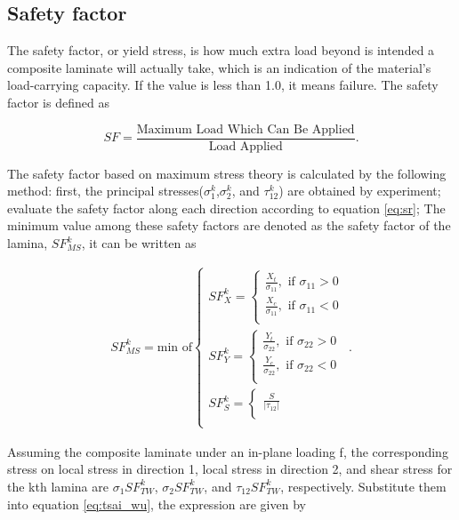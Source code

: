 \subsection{Safety factor}
The safety factor, or yield stress, is how much extra load beyond is intended a
composite laminate will actually take, which is an indication of the material's
load-carrying capacity. If the value is less than 1.0, it means failure. The
safety factor is defined as 

\begin{equation} \label{eq:sr}SF=\frac{\text {Maximum Load Which Can Be
	Applied}}{\text {Load Applied}} {\textstyle .}
\end{equation}

The safety factor based on maximum stress theory is calculated by the following
method: first, the principal stresses($\sigma_1^k$,$\sigma_2^k$, and
$\tau_{12}^k$) are obtained by experiment; evaluate the safety factor along each
direction according to equation \ref{eq:sr}; The minimum value among these
safety factors are denoted as the safety factor of the lamina, $SF_{MS}^k$, it
can be written as 

\begin{align}
	SF_{MS}^k = \text{min of}
	\begin{cases}
		SF_X^k = 
		\begin{cases}
			\frac{X_t}{\sigma_{11}}, \text{ if } \sigma_{11}>0 \\
			\frac{X_c}{\sigma_{11}}, \text{ if } \sigma_{11}<0 \\
		\end{cases} \\
		SF_Y^k = 
		\begin{cases}
			\frac{Y_t}{\sigma_{22}}, \text{ if } \sigma_{22}>0 \\
			\frac{Y_c}{\sigma_{22}}, \text{ if } \sigma_{22}<0 \\
		\end{cases} \\
		SF_S^k =
		\begin{cases}
			\frac{S}{|\tau_{12}|} \\
		\end{cases} \\
	\end{cases} \textstyle{.}
\end{align}


Assuming the composite laminate under an in-plane loading f, the corresponding
stress on local stress in direction 1, local stress in direction 2, and shear
stress for the kth lamina are $\sigma_1 SF_{TW}^k$, $\sigma_2SF_{TW}^k$, and $\tau_{12}SF_{TW}^k$,
respectively. Substitute them into equation \ref{eq:tsai_wu}, the expression
are given by

